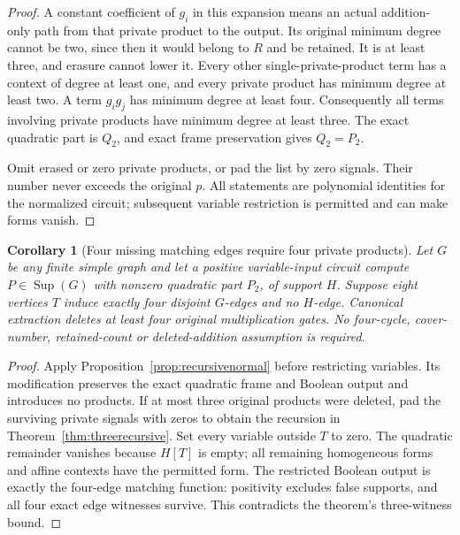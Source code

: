 \documentclass[11pt]{article}
\newcommand{\Sup}{\operatorname{Sup}}
\newtheorem{corollary}[theorem]{Corollary}
\theoremstyle{definition}
\theoremstyle{remark}
\begin{document}
\begin{proof}
A constant coefficient of $g_i$ in this expansion means an actual addition-only path from that private product to the output. Its original minimum degree cannot be two, since then it would belong to $R$ and be retained. It is at least three, and erasure cannot lower it. Every other single-private-product term has a context of degree at least one, and every private product has minimum degree at least two. A term $g_ig_j$ has minimum degree at least four. Consequently all terms involving private products have minimum degree at least three. The exact quadratic part is $Q_2$, and exact frame preservation gives $Q_2=P_2$.

Omit erased or zero private products, or pad the list by zero signals. Their number never exceeds the original $p$. All statements are polynomial identities for the normalized circuit; subsequent variable restriction is permitted and can make forms vanish.
\end{proof}

\begin{corollary}[Four missing matching edges require four private products]\label{cor:fourdeletedproducts}
Let $G$ be any finite simple graph and let a positive variable-input circuit compute $P\in\Sup(G)$ with nonzero quadratic part $P_2$, of support $H$. Suppose eight vertices $T$ induce exactly four disjoint $G$-edges and no $H$-edge. Canonical extraction deletes at least four original multiplication gates. No four-cycle, cover-number, retained-count or deleted-addition assumption is required.
\end{corollary}
\begin{proof}
Apply Proposition~\ref{prop:recursivenormal} before restricting variables. Its modification preserves the exact quadratic frame and Boolean output and introduces no products. If at most three original products were deleted, pad the surviving private signals with zeros to obtain the recursion in Theorem~\ref{thm:threerecursive}. Set every variable outside $T$ to zero. The quadratic remainder vanishes because $H[T]$ is empty; all remaining homogeneous forms and affine contexts have the permitted form. The restricted Boolean output is exactly the four-edge matching function: positivity excludes false supports, and all four exact edge witnesses survive. This contradicts the theorem's three-witness bound.
\end{proof}
\end{document}
